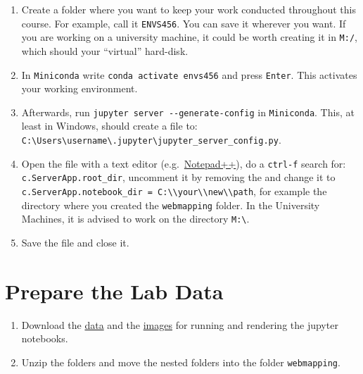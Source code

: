 \documentclass[
  letterpaper,
  DIV=11,
  numbers=noendperiod]{scrreprt}
\providecommand{\tightlist}{%
  \setlength{\itemsep}{0pt}\setlength{\parskip}{0pt}}\usepackage{longtable,booktabs,array}
\begin{document}
\begin{enumerate}
\def\labelenumi{\arabic{enumi}.}
\tightlist
\item
  Create a folder where you want to keep your work conducted throughout
  this course. For example, call it \texttt{ENVS456}. You can save it
  wherever you want. If you are working on a university machine, it
  could be worth creating it in \texttt{M:/}, which should your
  ``virtual'' hard-disk.
\item
  In \texttt{Miniconda} write \texttt{conda\ activate\ envs456} and
  press \texttt{Enter}. This activates your working environment.
\item
  Afterwards, run \texttt{jupyter\ server\ -\/-generate-config} in
  \texttt{Miniconda}. This, at least in Windows, should create a file
  to:
  \texttt{C:\textbackslash{}Users\textbackslash{}username\textbackslash{}.jupyter\textbackslash{}jupyter\_server\_config.py}.
\item
  Open the file with a text editor
  (e.g.~\href{https://notepad-plus-plus.org}{Notepad++}), do a
  \texttt{ctrl-f} search for: \texttt{c.ServerApp.root\_dir}, uncomment
  it by removing the and change it to
  \texttt{c.ServerApp.notebook\_dir\ =\ \textquotesingle{}C:\textbackslash{}\textbackslash{}your\textbackslash{}\textbackslash{}new\textbackslash{}\textbackslash{}path},
  for example the directory where you created the \texttt{webmapping}
  folder. In the University Machines, it is advised to work on the
  directory \texttt{M:\textbackslash{}}.
\item
  Save the file and close it.
\end{enumerate}

\section*{Prepare the Lab Data}\label{prepare-the-lab-data}


\begin{enumerate}
\def\labelenumi{\arabic{enumi}.}
\tightlist
\item
  Download the
  \href{https://minhaskamal.github.io/DownGit/\#/home?url=https://github.com/GDSL-UL/wma/tree/main/data}{data}
  and the
  \href{https://minhaskamal.github.io/DownGit/\#/home?url=https://github.com/GDSL-UL/wma/tree/main/img}{images}
  for running and rendering the jupyter notebooks.
\item
  Unzip the folders and move the nested folders into the folder
  \texttt{webmapping}.
\end{enumerate}
\end{document}
